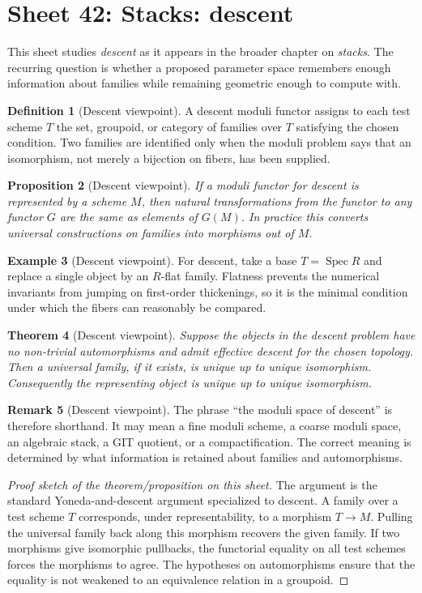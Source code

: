 \documentclass[11pt]{amsart}
\newtheorem{theorem}{Theorem}[section]
\newtheorem{proposition}[theorem]{Proposition}
\theoremstyle{definition}
\newtheorem{definition}[theorem]{Definition}
\newtheorem{example}[theorem]{Example}
\newtheorem{remark}[theorem]{Remark}
\newcommand{\Spec}{\operatorname{Spec}}
\begin{document}
\section{Sheet 42: Stacks: descent}
This sheet studies \emph{descent} as it appears in the broader chapter on \emph{stacks}.  The recurring question is whether a proposed parameter space remembers enough information about families while remaining geometric enough to compute with.
\begin{definition}[Descent viewpoint]
A descent moduli functor assigns to each test scheme $T$ the set, groupoid, or category of families over $T$ satisfying the chosen condition.  Two families are identified only when the moduli problem says that an isomorphism, not merely a bijection on fibers, has been supplied.
\end{definition}
\begin{proposition}[Descent viewpoint]
If a moduli functor for descent is represented by a scheme $M$, then natural transformations from the functor to any functor $G$ are the same as elements of $G(M)$.  In practice this converts universal constructions on families into morphisms out of $M$.
\end{proposition}
\begin{example}[Descent viewpoint]
For descent, take a base $T=\Spec R$ and replace a single object by an $R$-flat family.  Flatness prevents the numerical invariants from jumping on first-order thickenings, so it is the minimal condition under which the fibers can reasonably be compared.
\end{example}
\begin{theorem}[Descent viewpoint]
Suppose the objects in the descent problem have no non-trivial automorphisms and admit effective descent for the chosen topology.  Then a universal family, if it exists, is unique up to unique isomorphism.  Consequently the representing object is unique up to unique isomorphism.
\end{theorem}
\begin{remark}[Descent viewpoint]
The phrase ``the moduli space of descent'' is therefore shorthand.  It may mean a fine moduli scheme, a coarse moduli space, an algebraic stack, a GIT quotient, or a compactification.  The correct meaning is determined by what information is retained about families and automorphisms.
\end{remark}
\begin{proof}[Proof sketch of the theorem/proposition on this sheet]
The argument is the standard Yoneda-and-descent argument specialized to descent.  A family over a test scheme $T$ corresponds, under representability, to a morphism $T\to M$.  Pulling the universal family back along this morphism recovers the given family.  If two morphisms give isomorphic pullbacks, the functorial equality on all test schemes forces the morphisms to agree.  The hypotheses on automorphisms ensure that the equality is not weakened to an equivalence relation in a groupoid.
\end{proof}
\end{document}
